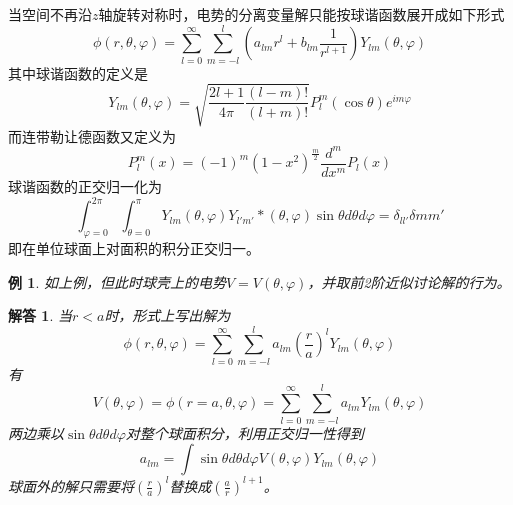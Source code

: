 \documentclass[a4paper,11pt]{ctexbook}
\newtheorem{eg}{例}[section]
\newtheorem{ans}{解答}[section]
\newcommand{\beq}{\begin{equation}}
\newcommand{\eeq}{\end{equation}}
\begin{document}
\par
当空间不再沿$z$轴旋转对称时，电势的分离变量解只能按球谐函数展开成如下形式
\beq
\phi(r,\theta,\varphi) =\sum_{l=0}^\infty \sum_{m=-l}^{l} \left( a_{lm} r^l + b_{lm} \frac{1}{r^{l+1}}\right) Y_{lm}(\theta,\varphi)
\eeq
其中球谐函数的定义是
\beq
Y_{lm}(\theta,\varphi) = \sqrt{ \frac{2l+1}{4\pi} \frac{(l-m)!}{(l+m)!}} P_l^m(\cos \theta) e^{im\varphi}
\eeq
而连带勒让德函数又定义为
\beq
P_l^m (x) = (-1)^m (1-x^2)^{\frac{m}{2}} \frac{d^m}{dx^m} P_l(x)
\eeq
球谐函数的正交归一化为
\beq
\int_{\varphi = 0}^{2\pi} \int_{\theta = 0}^\pi Y_{lm}(\theta,\varphi) Y_{l'm'}*(\theta,\varphi) \sin \theta d\theta d \varphi = \delta_{ll'} \delta{mm'}
\eeq
即在单位球面上对面积的积分正交归一。
\begin{eg}
如上例，但此时球壳上的电势$V=V(\theta,\varphi)$，并取前2阶近似讨论解的行为。
\end{eg}
\begin{ans}
当$r<a$时，形式上写出解为
\beq
\phi(r,\theta,\varphi) =\sum_{l=0}^\infty \sum_{m=-l}^{l} a_{lm} \left( \frac{r}{a} \right)^lY_{lm}(\theta,\varphi)
\eeq
有
\beq
V(\theta,\varphi) = \phi(r=a,\theta,\varphi) = \sum_{l=0}^\infty \sum_{m=-l}^{l} a_{lm} Y_{lm}(\theta,\varphi)
\eeq
两边乘以$\sin \theta d\theta d \varphi$对整个球面积分，利用正交归一性得到
\beq
a_{lm} = \int \sin \theta d \theta d \varphi V(\theta,\varphi) Y_{lm}(\theta,\varphi)
\eeq
球面外的解只需要将$\left(\frac{r}{a}\right)^l$替换成$\left( \frac{a}{r}\right)^{l+1}$。
 
 
\end{ans}
\end{document}
